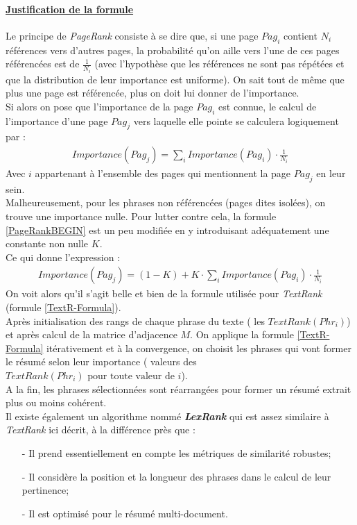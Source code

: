 \paragraph{\underline{Justification de la formule}}
Le principe de \textit{PageRank} consiste à se dire que, si une page $ Pag_{i} $ contient $ N_{i} $ références vers d'autres pages, la probabilité qu'on aille vers l'une de ces pages référencées est de $ \frac{1}{N_{i}} $ (avec l'hypothèse que les références ne sont pas répétées et que la distribution de leur importance est uniforme). On sait tout de même que plus une page est référencée, plus on doit lui donner de l'importance.\\
Si alors on pose que l'importance de la page $ Pag_{i} $ est connue, le calcul de l'importance d'une page $ Pag_{j} $ vers laquelle elle pointe se calculera logiquement par :
\begin{eqnarray}\label{PageRankBEGIN}
Importance(Pag_{j}) = \sum_{i} Importance(Pag_{i})\cdot \frac{1}{N_{i}}
\end{eqnarray}
Avec $ i $ appartenant à l'ensemble des pages qui mentionnent la page $ Pag_{j} $ en leur sein.\\
Malheureusement, pour les phrases non référencées (pages dites isolées), on trouve une importance nulle. Pour lutter contre cela, la formule \ref{PageRankBEGIN} est un peu modifiée en y introduisant adéquatement une constante non nulle $ K $.\\
Ce qui donne l'expression \cite{brin1998anatomy} :
\begin{eqnarray}\label{PageRank}
Importance(Pag_{j}) =(1-K) + K\cdot\sum_{i} Importance(Pag_{i})\cdot \frac{1}{N_{i}}
\end{eqnarray}
On voit alors qu'il s'agit belle et bien de la formule utilisée pour \textit{TextRank} (formule \ref{TextR-Formula}).\\

Après initialisation des rangs de chaque phrase du texte ( les $ TextRank(Phr_{i}) $) et après calcul de la matrice d'adjacence $ M $. On applique la formule \ref{TextR-Formula} itérativement et à la convergence, on choisit les phrases qui vont former le résumé selon leur importance ( valeurs des $ TextRank(Phr_{i}) \mbox{ pour toute valeur de } i $).\\
A la fin, les phrases sélectionnées sont réarrangées pour former un résumé extrait plus ou moins cohérent.\\

Il existe également un algorithme nommé \textit{\textbf{LexRank}} \cite{erkan2004lexrank} qui est assez similaire à \textit{TextRank} ici décrit, à la différence près que :
\begin{itemize}
\item[-] Il prend essentiellement en compte les métriques de similarité robustes;
\item[-] Il considère la position et la longueur des phrases dans le calcul de leur pertinence;
\item[-] Il est optimisé pour le résumé multi-document.
\end{itemize}

